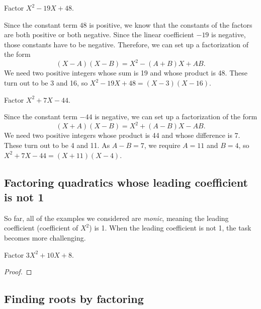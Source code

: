 \begin{example}
Factor $X^2 - 19X + 48$.
\end{example}
\begin{solution}
Since the constant term $48$ is positive, we know that the constants of the factors are both positive or both negative. Since the linear coefficient $-19$ is negative, those constants have to be negative. Therefore, we can set up a factorization of the form
\begin{equation*}
(X - A)(X - B) = X^2 - (A + B)X + AB.
\end{equation*}
We need two positive integers whose sum is 19 and whose product is 48. These turn out to be 3 and 16, so $X^2 - 19X + 48 = \boxed{(X - 3)(X - 16)}$.
\end{solution}

\begin{example}
Factor $X^2 + 7X - 44$.
\end{example}
\begin{solution}
Since the constant term $-44$ is negative, we can set up a factorization of the form
\begin{equation*}
(X + A)(X - B) = X^2 + (A - B)X - AB.
\end{equation*}
We need two positive integers whose product is 44 and whose difference is 7. These turn out to be 4 and 11. As $A - B = 7$, we require $A = 11$ and $B = 4$, so $X^2 + 7X - 44 = \boxed{(X + 11)(X - 4)}$.
\end{solution}


\subsection{Factoring quadratics whose leading coefficient is not 1}

So far, all of the examples we considered are \emph{monic}, meaning the leading coefficient (coefficient of $X^2$) is 1. When the leading coefficient is not 1, the task becomes more challenging.

\begin{example}
Factor $3X^2 + 10X + 8$.
\end{example}
\begin{proof}

\end{proof}


\subsection{Finding roots by factoring}


